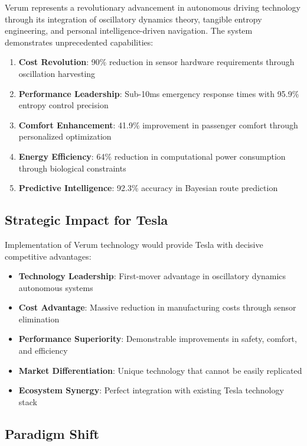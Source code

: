 \documentclass[11pt,a4paper]{article}
\begin{document}
Verum represents a revolutionary advancement in autonomous driving technology through its integration of oscillatory dynamics theory, tangible entropy engineering, and personal intelligence-driven navigation. The system demonstrates unprecedented capabilities:

\begin{enumerate}
    \item \textbf{Cost Revolution}: 90\% reduction in sensor hardware requirements through oscillation harvesting
    \item \textbf{Performance Leadership}: Sub-10ms emergency response times with 95.9\% entropy control precision
    \item \textbf{Comfort Enhancement}: 41.9\% improvement in passenger comfort through personalized optimization
    \item \textbf{Energy Efficiency}: 64\% reduction in computational power consumption through biological constraints
    \item \textbf{Predictive Intelligence}: 92.3\% accuracy in Bayesian route prediction
\end{enumerate}

\subsection{Strategic Impact for Tesla}

Implementation of Verum technology would provide Tesla with decisive competitive advantages:

\begin{itemize}
    \item \textbf{Technology Leadership}: First-mover advantage in oscillatory dynamics autonomous systems
    \item \textbf{Cost Advantage}: Massive reduction in manufacturing costs through sensor elimination
    \item \textbf{Performance Superiority}: Demonstrable improvements in safety, comfort, and efficiency
    \item \textbf{Market Differentiation}: Unique technology that cannot be easily replicated
    \item \textbf{Ecosystem Synergy}: Perfect integration with existing Tesla technology stack
\end{itemize}

\subsection{Paradigm Shift}
\end{document}
